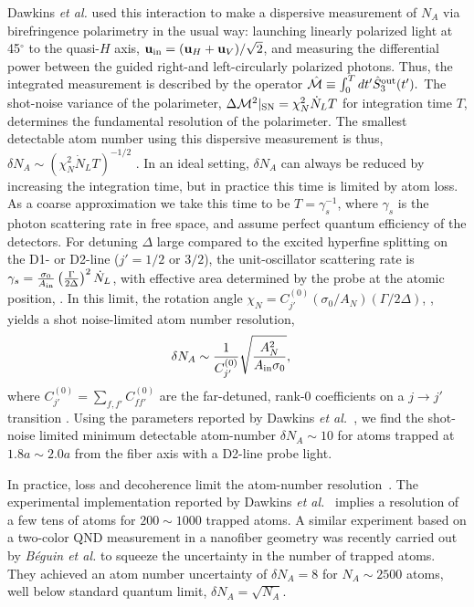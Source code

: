 \documentclass[aps,pra,twocolumn]{revtex4-1} %
\newcommand{\inp}{{\rm in}}
\newcommand{\shotnoise}{\Delta \mathcal{M}^2 |_{\rm SN}}
\newcommand{\chiN}{\chi_{N}}
\newcommand{\Abir}{A_N}
\begin{document}
Dawkins {\em et al.} \cite{dawkins_dispersive_2011} used this interaction to make a dispersive measurement of $N_A$ via birefringence polarimetry in the usual way: launching linearly polarized light at 45$^\circ$ to the quasi-$H$ axis, $\mbf{u}_\inp = (\mbf{u}_H + \mbf{u}_V )/\sqrt{2}$, and measuring the differential power between the guided right-and left-circularly polarized photons. 
Thus, the integrated measurement is described by the operator $\hat{\mathcal{M}} \equiv \int_0^T dt' \hat{S}^{\rm out}_3(t').$  The shot-noise variance of the polarimeter, $\shotnoise =  \chiN^2 \dot{N}_L T$ for integration time $T$,  determines the fundamental resolution of the polarimeter.  
The smallest detectable atom number using this dispersive measurement is thus, $\delta N_A \sim ( \chiN^2 \dot{N}_L T)^{-1/2}$ \cite{smith_faraday_2003}.  
In an ideal setting, $\delta N_A$ can always be reduced by increasing the integration time, but in practice this time is limited by atom loss. As a coarse approximation we take this time to be $T=\gamma_s^{-1}$, where $\gamma_s$ is the photon scattering rate in free space, and assume perfect quantum efficiency of the detectors.  
For detuning $\Delta$ large compared to the excited hyperfine splitting on the D1- or D2-line ($j' = 1/2$ or $3/2$), the unit-oscillator scattering rate is 
$\gamma_s =\frac{\sigma_0}{A_{\rm in}}\left(\frac{\Gamma}{2 \Delta}\right)^2 \dot{N}_L $, 
with effective area determined by the probe at the atomic position, .  
In this limit, the rotation angle $\chiN = C^{(0)}_{j'} (\sigma_0/\Abir)(\Gamma/2\Delta)$, , yields a shot noise-limited atom number resolution, 
	\begin{align} \label{Eq::AtomNumberResolution}
		\delta N_A  &\sim \frac{1}{C^{(0)}_{j'}}\sqrt {\frac{\Abir^2}{A_{\rm in} \sigma_0}},
	\end{align}
where $ C^{(0)}_{j'}=\sum_{f,f'}C^{(0)}_{ff'}$ are the far-detuned, rank-$0$ coefficients on a $j \rightarrow j'$ transition \cite{deutsch_quantum_2010}.  
Using the parameters reported by Dawkins \emph{et al.}~\cite{dawkins_dispersive_2011}, we find the shot-noise limited minimum detectable atom-number $\delta N_A \sim 10$ for atoms trapped at $ 1.8a\sim 2.0a $ from the fiber axis with a D2-line probe light. 

In practice, loss and decoherence limit the atom-number resolution~\cite{dawkins_dispersive_2011, zhang_collective_2012}. 
The experimental implementation reported by Dawkins \emph{et al.}~\cite{dawkins_dispersive_2011} implies a resolution of a few tens of atoms for $ 200\sim 1000 $ trapped atoms.  
A similar experiment based on a two-color QND measurement in a nanofiber geometry was recently carried out by \emph{B\'{e}guin et al.} \cite{beguin_generation_2014} to squeeze the uncertainty in the number of trapped atoms. They achieved an atom number uncertainty of $\delta N_A = 8$ for $N_A\sim2500$ atoms, well below standard quantum limit, $\delta N_A=\sqrt{N_A}$.
\end{document}

